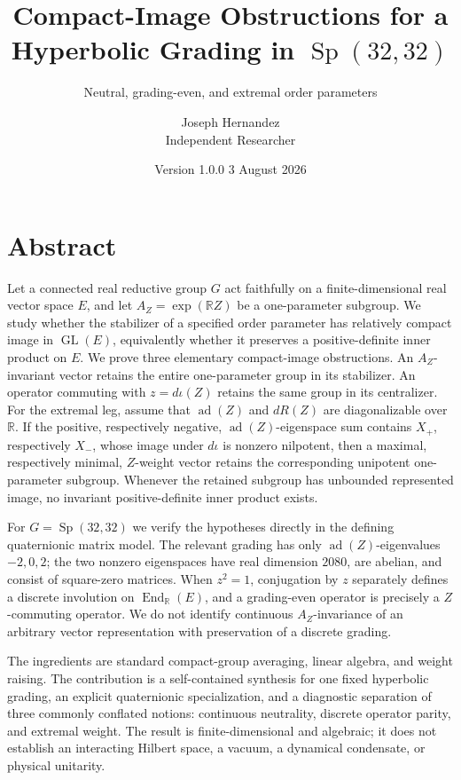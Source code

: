 \documentclass[
  10pt,
  letterpaper,
  oneside]{scrartcl}
\title{Compact-Image Obstructions for a Hyperbolic Grading in
\(\operatorname{Sp}(32,32)\)}
\subtitle{Neutral, grading-even, and extremal order parameters}
\author{Joseph Hernandez\\{\small Independent Researcher}}
\date{Version 1.0.0 \textperiodcentered{} 3 August 2026}
\begin{document}
\maketitle

\section{Abstract}\label{abstract}

Let a connected real reductive group \(G\) act faithfully on a
finite-dimensional real vector space \(E\), and let
\(A_Z=\exp(\mathbb R Z)\) be a one-parameter subgroup. We study whether
the stabilizer of a specified order parameter has relatively compact
image in \(\operatorname{GL}(E)\), equivalently whether it preserves a
positive-definite inner product on \(E\). We prove three elementary
compact-image obstructions. An \(A_Z\)-invariant vector retains the
entire one-parameter group in its stabilizer. An operator commuting with
\(z=d\iota(Z)\) retains the same group in its centralizer. For the
extremal leg, assume that \(\operatorname{ad}(Z)\) and \(dR(Z)\) are
diagonalizable over \(\mathbb R\). If the positive, respectively
negative, \(\operatorname{ad}(Z)\)-eigenspace sum contains \(X_+\),
respectively \(X_-\), whose image under \(d\iota\) is nonzero nilpotent,
then a maximal, respectively minimal, \(Z\)-weight vector retains the
corresponding unipotent one-parameter subgroup. Whenever the retained
subgroup has unbounded represented image, no invariant positive-definite
inner product exists.

For \(G=\operatorname{Sp}(32,32)\) we verify the hypotheses directly in
the defining quaternionic matrix model. The relevant grading has only
\(\operatorname{ad}(Z)\)-eigenvalues \(-2,0,2\); the two nonzero
eigenspaces have real dimension \(2080\), are abelian, and consist of
square-zero matrices. When \(z^2=1\), conjugation by \(z\) separately
defines a discrete involution on \(\operatorname{End}_{\mathbb R}(E)\),
and a grading-even operator is precisely a \(Z\)-commuting operator. We
do not identify continuous \(A_Z\)-invariance of an arbitrary vector
representation with preservation of a discrete grading.

The ingredients are standard compact-group averaging, linear algebra,
and weight raising. The contribution is a self-contained synthesis for
one fixed hyperbolic grading, an explicit quaternionic specialization,
and a diagnostic separation of three commonly conflated notions:
continuous neutrality, discrete operator parity, and extremal weight.
The result is finite-dimensional and algebraic; it does not establish an
interacting Hilbert space, a vacuum, a dynamical condensate, or physical
unitarity.
\end{document}
